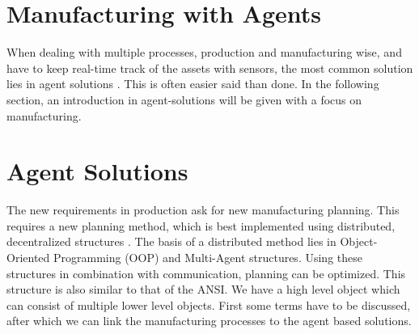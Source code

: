 \section*{Manufacturing with Agents}
When dealing with multiple processes, production and manufacturing wise, and have to keep real-time track of the assets with sensors, the most common solution lies in agent solutions \citep{leitao2013past, monostori2016cyber}. This is often easier said than done. In the following section, an introduction in agent-solutions will be given with a focus on manufacturing.
%
%
%
%
\newpage
\section{Agent Solutions}
The new requirements in production ask for new manufacturing planning. This requires a new planning method, which is best implemented using distributed, decentralized structures \citep{parunak1999industrial}. The basis of a distributed method lies in Object-Oriented Programming (OOP) and Multi-Agent structures. Using these structures in combination with communication, planning can be optimized. This structure is also similar to that of the ANSI. We have a high level object which can consist of multiple lower level objects. First some terms have to be discussed, after which we can link the manufacturing processes to the agent based solutions.

